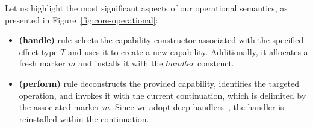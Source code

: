 \documentclass[acmsmall,review,screen]{acmart}
\begin{document}

Let us highlight the most significant aspects of our operational semantics, as presented in Figure~\ref{fig:core-operational}:
\begin{itemize}
    \item \textbf{(handle)} rule selects the capability constructor associated with the specified effect type $T$ and uses it to create a new capability.
    Additionally, it allocates a fresh marker $m$ and installs it with the $handler$ construct.
    \item \textbf{(perform)} rule deconstructs the provided capability, identifies the targeted operation, and invokes it with the current continuation, which is delimited by the associated marker $m$.
    Since we adopt deep handlers~\cite{hillerstrom2018shallow}, the handler is reinstalled within the continuation.
\end{itemize}
\end{document}
